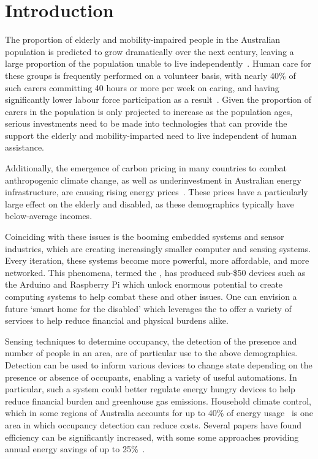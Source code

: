 \documentclass[../thesis/thesis.tex]{subfiles}
\begin{document}
\chapter{Introduction}
The proportion of elderly and mobility-impaired people in the Australian population is predicted to grow dramatically over the next century, leaving a large proportion of the population unable to live independently~\cite{chan2009smart}. Human care for these groups is frequently performed on a volunteer basis, with nearly 40\% of such carers committing 40 hours or more per week on caring, and having significantly lower labour force participation as a result~\cite{abs4430}. Given the proportion of carers in the population is only projected to increase as the population ages, serious investments need to be made into technologies that can provide the support the elderly and mobility-imparted need to live independent of human assistance.

Additionally, the emergence of carbon pricing in many countries to combat anthropogenic climate change, as well as underinvestment in Australian energy infrastructure, are causing rising energy prices~\cite{energyprices}. These prices have a particularly large effect on the elderly and disabled, as these demographics typically have below-average incomes.

Coinciding with these issues is the booming embedded systems and sensor industries, which are creating increasingly smaller computer and sensing systems. Every iteration, these systems become more powerful, more affordable, and more networked. This phenomena, termed the \iot, has produced sub-\$50 devices such as the Arduino and Raspberry Pi which unlock enormous potential to create computing systems to help combat these and other issues. One can envision a future `smart home for the disabled' which leverages the \iot to offer a variety of services to help reduce financial and physical burdens alike.

Sensing techniques to determine occupancy, the detection of the presence and number of people in an area, are of particular use to the above demographics. Detection can be used to inform various devices to change state depending on the presence or absence of occupants, enabling a variety of useful automations. In particular, such a system could better regulate energy hungry devices to help reduce financial burden and greenhouse gas emissions. Household climate control, which in some regions of Australia accounts for up to 40\% of energy usage~\cite{abs4602} is one area in which occupancy detection can reduce costs. Several papers have found efficiency can be significantly increased, with some some approaches providing annual energy savings of up to 25\%~\cite{beltran2013thermosense}.
 
\end{document}
